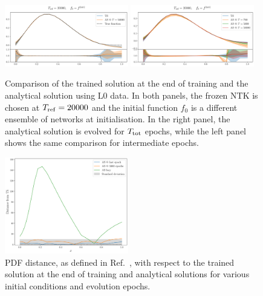 \newpage


\begin{figure}[h]
    \centering
    \includegraphics[width=0.48\textwidth]{plots/analytical_solution/pdf_plot_init_last_epoch_L0.pdf}
    \includegraphics[width=0.48\textwidth]{plots/analytical_solution/pdf_plot_init_epochs_L0.pdf}
    \caption{Comparison of the trained solution at the end of training and
    the analytical solution using L0 data. In both panels, the
    frozen NTK is chosen at $T_{\rm ref} = 20000$ and the initial function $f_0$
    is a different ensemble of networks at initialisation. In the right panel,
    the analytical solution is evolved for $T_{\rm tot}$ epochs, while the left
    panel shows the same comparison for intermediate epochs.}
    \label{fig:xT3_analytical_init_L0}
  \end{figure}
  \begin{figure}[h]
    \centering
    \includegraphics[width=0.48\textwidth]{plots/analytical_solution/distance_plot_L0.pdf}
    \caption{PDF distance, as defined in Ref.~\cite{NNPDF:2021njg}, with respect to
    the trained solution at the end of training and analytical
    solutions for various initial conditions and evolution epochs.}
    \label{fig:xT3_distance_L0}
  \end{figure}

